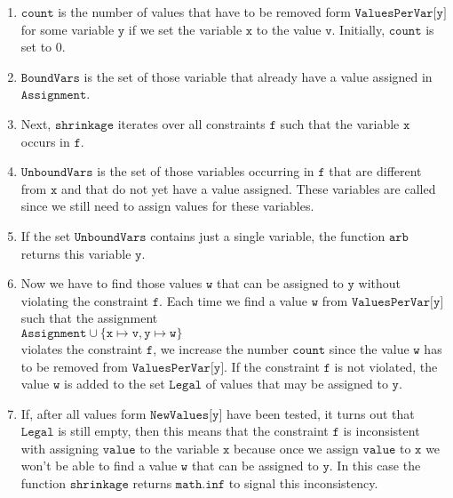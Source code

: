 \begin{enumerate}
\item $\texttt{count}$ is the number of values that have to be removed form $\texttt{ValuesPerVar[y]}$ 
      for some variable $\texttt{y}$ if we set the variable $\texttt{x}$ to the value $\texttt{v}$.  
      Initially, $\texttt{count}$ is set to $0$.
\item $\texttt{BoundVars}$ is the set of those variable that already have a value assigned in $\texttt{Assignment}$.
\item Next, $\texttt{shrinkage}$ iterates over all  constraints $\texttt{f}$ such that the variable
      $\texttt{x}$ occurs in $\texttt{f}$.
\item $\texttt{UnboundVars}$ is the set of those variables occurring in $\texttt{f}$ that are different from
      $\texttt{x}$ and that do not yet have a value assigned.  These variables are called  
      since we still need to assign values for these variables.
\item If the set $\texttt{UnboundVars}$ contains just a single variable,
      the function $\texttt{arb}$ returns this variable $\texttt{y}$.
\item Now we have to find those values $\texttt{w}$ that can be assigned to $\texttt{y}$ without violating the
      constraint $\texttt{f}$.  Each time we find a value $\texttt{w}$ from $\texttt{ValuesPerVar[y]}$ such that
      the assignment
      \\[0.2cm]
      \hspace*{1.3cm}
      $\texttt{Assignment} \cup \{ \texttt{x} \mapsto \texttt{v}, \texttt{y} \mapsto \texttt{w} \}$
      \\[0.2cm]
      violates the constraint $\texttt{f}$, we increase the number $\texttt{count}$ since the value $\texttt{w}$
      has to be removed from $\texttt{ValuesPerVar[y]}$.  If the constraint $\texttt{f}$ is not violated,
      the value $\texttt{w}$ is added to the set $\texttt{Legal}$ of values that may be assigned to $\texttt{y}$.
\item If, after all values form $\texttt{NewValues[y]}$ have been tested, it turns out that
      $\texttt{Legal}$ is still empty, then this means that the constraint $\texttt{f}$ is inconsistent with
      assigning $\texttt{value}$  to the variable $\texttt{x}$ because 
      once we assign $\texttt{value}$ to $\texttt{x}$ we won't be able to find a value $\texttt{w}$ that can be
      assigned to $\texttt{y}$.  
      In this case the function $\texttt{shrinkage}$ returns $\texttt{math.inf}$ to signal this inconsistency.
\end{enumerate}


